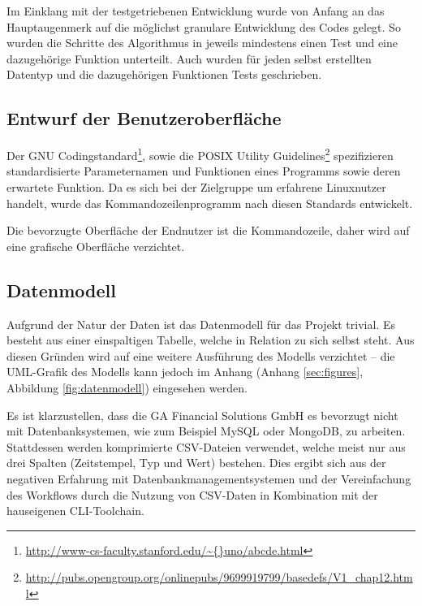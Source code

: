 Im Einklang mit der testgetriebenen Entwicklung wurde von Anfang an das Hauptaugenmerk
auf die möglichst granulare Entwicklung des Codes gelegt. So wurden die Schritte
des Algorithmus in jeweils mindestens einen Test und eine dazugehörige Funktion unterteilt.
Auch wurden für jeden selbst erstellten Datentyp und die dazugehörigen Funktionen Tests geschrieben.




\subsection{Entwurf der Benutzeroberfläche}
Der GNU Codingstandard\footnote{\url{http://www-cs-faculty.stanford.edu/\~{}uno/abcde.html}},
sowie die POSIX Utility Guidelines\footnote{\url{http://pubs.opengroup.org/onlinepubs/9699919799/basedefs/V1_chap12.html}}
spezifizieren standardisierte Parameternamen und Funktionen eines Programms sowie
deren erwartete Funktion. Da es sich bei der Zielgruppe um erfahrene Linuxnutzer handelt, wurde das Kommandozeilenprogramm nach diesen Standards entwickelt.\par

Die bevorzugte Oberfläche der Endnutzer ist die Kommandozeile, daher wird auf eine grafische Oberfläche verzichtet.

\subsection{Datenmodell}
Aufgrund der Natur der Daten ist das Datenmodell für das Projekt trivial. Es besteht aus einer
einspaltigen Tabelle, welche in Relation zu sich selbst steht. Aus diesen Gründen wird auf eine weitere Ausführung des 
Modells verzichtet -- die UML-Grafik des Modells kann jedoch im Anhang (Anhang \ref{sec:figures}, Abbildung \ref{fig:datenmodell}) eingesehen werden.

Es ist klarzustellen, dass die GA Financial Solutions GmbH es bevorzugt nicht mit Datenbanksystemen, wie
 zum Beispiel MySQL oder MongoDB, zu arbeiten. Stattdessen werden komprimierte CSV-Dateien verwendet, welche
meist nur aus drei Spalten (Zeitstempel, Typ und Wert) bestehen. Dies ergibt sich aus
der negativen Erfahrung mit Datenbankmanagementsystemen und der Vereinfachung des Workflows durch
die Nutzung von CSV-Daten in Kombination mit der hauseigenen CLI-Toolchain.


